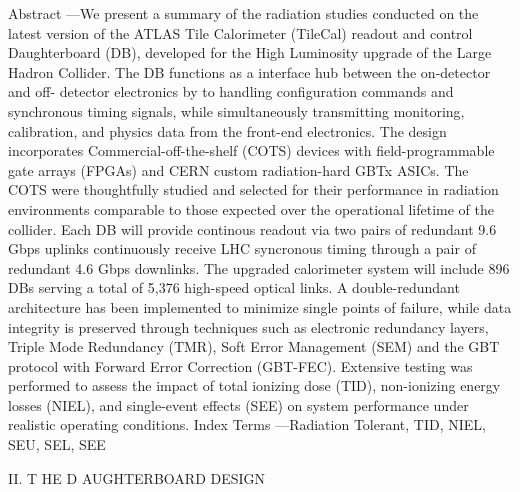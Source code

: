 \documentclass{article}
\begin{document}
Abstract ---We   present   a   summary   of   the   radiation   studies 
conducted   on   the   latest   version   of   the   ATLAS   Tile   Calorimeter 
(TileCal) readout and control Daughterboard (DB), developed for 
the   High   Luminosity   upgrade   of   the   Large   Hadron   Collider.   The 
DB functions   as a interface   hub   between   the   on-detector   and off- 
detector   electronics   by   to   handling   configuration   commands   and 
synchronous   timing   signals,   while   simultaneously   transmitting 
monitoring,   calibration,   and   physics   data   from   the   front-end 
electronics.   The   design   incorporates   Commercial-off-the-shelf 
(COTS)   devices   with   field-programmable   gate   arrays   (FPGAs) 
and   CERN   custom   radiation-hard   GBTx   ASICs.   The   COTS 
were   thoughtfully   studied   and   selected   for   their   performance 
in   radiation   environments   comparable   to   those   expected   over 
the   operational   lifetime   of   the   collider.   Each   DB   will   provide 
continous   readout   via   two   pairs   of   redundant   9.6   Gbps   uplinks 
continuously   receive   LHC   syncronous   timing   through   a   pair   of 
redundant 4.6 Gbps downlinks. The upgraded calorimeter system 
will   include   896   DBs   serving   a   total   of   5,376   high-speed   optical 
links.   A   double-redundant   architecture   has   been   implemented   to 
minimize single points of failure, while data integrity is preserved 
through   techniques   such   as   electronic   redundancy   layers,   Triple 
Mode   Redundancy   (TMR),   Soft   Error   Management   (SEM)   and 
the   GBT   protocol   with   Forward   Error   Correction   (GBT-FEC). 
Extensive   testing   was   performed   to   assess   the   impact   of   total 
ionizing   dose   (TID),   non-ionizing   energy   losses   (NIEL),   and 
single-event   effects   (SEE)   on   system   performance   under   realistic 
operating   conditions. 
Index Terms ---Radiation Tolerant, TID, NIEL, SEU, SEL, SEE

II.   T HE  D AUGHTERBOARD   DESIGN
\end{document}
